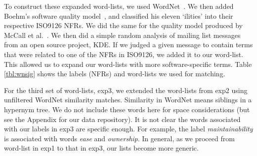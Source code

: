 \documentclass[smallextended]{svjour3}       %
\begin{document}
To construct these expanded word-lists, we used
WordNet~\cite{Fellbaum1998}.
We then added Boehm's software quality model~\cite{Boehm+:1976:ICSE}, and classified his eleven `ilities' into their respective ISO9126 NFRs. 
We did the same for the quality model produced by McCall et al.~\cite{mccall1977}. 
We then did a simple random analysis of mailing list messages from an open source project, KDE. If we judged a given message to contain terms that were
related to one of the NFRs in ISO9126, we added it to our word-list. This allowed us to expand our word-lists with more software-specific terms.
Table \ref{tbl:wnsig} shows the labels (NFRs) and word-lists we used for matching.

For the third set of word-lists, \textsf{exp3}, we extended the word-lists from \textsf{exp2} using unfiltered WordNet similarity matches. 
Similarity in WordNet means siblings in a hypernym tree. 
We do not include these words here for space considerations (but see the Appendix for our data repository). 
It is not clear the words associated with our labels in \textsf{exp3} are specific enough. For example, the label \emph{maintainability} is associated with
words \emph{ease} and \emph{ownership}. In general, as we proceed from word-list in \textsf{exp1} to that in \textsf{exp3}, our lists become more generic.
\end{document}
